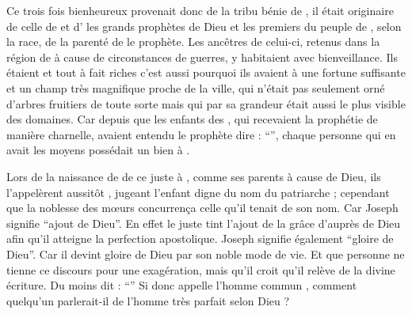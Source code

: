 Ce trois fois bienheureux provenait donc de la tribu bénie de , 
il était originaire de celle de  et d' %
les grands prophètes de Dieu et les premiers du peuple de ,
selon la race, de la parenté de  le prophète. 
Les ancêtres de celui-ci, retenus dans la région de  à cause de circonstances de guerres, %
y habitaient avec bienveillance. %
Ils étaient  et tout à fait riches
 c'est aussi pourquoi ils avaient à  une fortune suffisante et un  champ très magnifique proche de la ville, qui n'était pas seulement orné d'arbres fruitiers de toute sorte%
mais qui par sa grandeur était aussi  le plus visible des domaines.
Car depuis que les enfants des , qui recevaient la prophétie de manière charnelle, avaient entendu le prophète   dire : \enquote{}, chaque personne qui en avait les moyens possédait un bien à .

Lors de la naissance de de ce juste à , comme ses parents   à cause de Dieu, 
ils l'appelèrent aussitôt , jugeant l'enfant digne du nom du patriarche ; 
cependant que la noblesse des mœurs concurrença celle qu'il tenait de son nom.
Car Joseph signifie \enquote{ajout de Dieu}.
En effet le juste tint l'ajout de la grâce d'auprès de Dieu afin qu'il atteigne la perfection apostolique.
Joseph signifie également \enquote{gloire de Dieu}. %
Car il devint gloire de Dieu par son noble mode de vie.
Et que personne ne tienne ce discours pour une  exagération, 
mais qu'il croit qu'il relève de la divine écriture.
Du moins  dit : \enquote{}
Si donc  appelle l'homme commun , comment quelqu'un parlerait-il de l'homme très parfait selon Dieu ?

